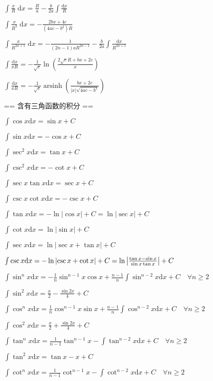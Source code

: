$\int\frac{x}{R}\;\mbox{d}x = \frac{R}{a}-\frac{b}{2a}\int\frac{\mbox{d}x}{R}$\par
$\int\frac{x}{R^3}\;\mbox{d}x = -\frac{2bx+4c}{(4ac-b^2)R}$\par
$\int\frac{x}{R^{2n+1}}\;\mbox{d}x = -\frac{1}{(2n-1)aR^{2n-1}}-\frac{b}{2a}\int\frac{\mbox{d}x}{R^{2n+1}}$\par
$\int\frac{\mbox{d}x}{xR}=-\frac{1}{\sqrt{c}}\ln\left(\frac{2\sqrt{c}R+bx+2c}{x}\right)$\par
$\int\frac{\mbox{d}x}{xR}=-\frac{1}{\sqrt{c}}\operatorname{arsinh}\left(\frac{bx+2c}{|x|\sqrt{4ac-b^2}}\right)$\par
== 含有三角函数的积分 ==\par
$\int\cos x\mbox{d}x=\sin x+C$\par
$\int\sin x\mbox{d}x= -\cos x+C$\par
$\int\sec^2x\mbox{d}x=\tan x+C$\par
$\int\csc^2x\mbox{d}x=-\cot x+C$\par
$\int\sec x\tan x\mbox{d}x=\sec x+C$\par
$\int\csc x\cot x\mbox{d}x=-\csc x+C$\par
$\int\tan x\mbox{d}x=-\ln{\left|\cos {x}\right|}+C=\ln{\left|\sec x\right|}+C$\par
$\int\cot x\mbox{d}x=\ln{\left|\sin x\right|}+C$\par
$\int\sec x\mbox{d}x=\ln{\left|\sec x+\tan x\right|}+C$\par
$\int\csc x\mbox{d}x=-\ln{\left|\csc x+\cot x\right|}+C=\ln{\left|{\tan x-\sin x\over\sin x\tan x}\right|}+C$\par
$\int \sin ^n x \mbox{d}x = - \frac{1}{n} \sin ^{n-1} x \cos x + \frac{n-1}{n} \int \sin ^{n-2} x \mbox{d}x +C \quad \forall n \ge 2$\par
$\int \sin ^2 x \mbox{d}x = \frac{x}{2}-\frac{\sin{2x}}{4} +C$\par
$\int \cos ^n x \mbox{d}x = \frac{1}{n} \cos ^{n-1} x \sin x + \frac{n-1}{n} \int \cos ^{n-2} x \mbox{d}x +C \quad \forall n \ge 2$\par
$\int \cos ^2 x \mbox{d}x = \frac{x}{2}+\frac{\sin{2x}}{4} +C$\par
$\int \tan ^n x \mbox{d}x = \frac{1}{n-1} \tan ^{n-1} x - \int \tan ^{n-2} x \mbox{d}x +C \quad \forall n \ge 2$\par
$\int \tan ^2 x \mbox{d}x = \tan x - x +C$\par
$\int \cot ^n x \mbox{d}x = \frac{1}{n-1} \cot ^{n-1} x - \int \cot ^{n-2} x \mbox{d}x +C \quad \forall n \ge 2$\par

